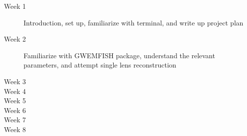 \documentclass[pdflatex,sn-mathphys-num]{sn-jnl}%
\theoremstyle{thmstyleone}%
\theoremstyle{thmstyletwo}%
\theoremstyle{thmstylethree}%
\begin{document}
\begin{description}
	\item[Week 1] Introduction, set up, familiarize with terminal, and write up project plan
	\item[Week 2] Familiarize with GWEMFISH package, understand the relevant parameters, and attempt single lens reconstruction
	\item[Week 3] 
	\item[Week 4]
	\item[Week 5]
	\item[Week 6]
	\item[Week 7]
	\item[Week 8]
\end{description}

\end{document}
